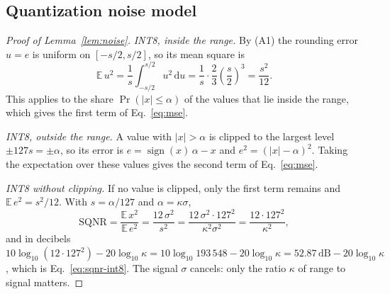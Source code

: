 \documentclass[pdflatex,sn-mathphys-num]{sn-jnl}%
\theoremstyle{thmstyleone}%
\theoremstyle{thmstyletwo}%
\theoremstyle{thmstylethree}%
\begin{document}
\begin{appendices}
\subsection{Quantization noise model}\label{sec:supp-noise}
\begin{proof}[Proof of Lemma~\ref{lem:noise}]
\emph{INT8, inside the range.} By (A1) the rounding error $u=e$ is uniform on $[-s/2,s/2]$, so its mean square is
\begin{equation*}
\mathbb{E}\,u^2=\frac{1}{s}\int_{-s/2}^{s/2}u^2\,\mathrm{d}u=\frac{1}{s}\cdot\frac{2}{3}\left(\frac{s}{2}\right)^3=\frac{s^2}{12}.
\end{equation*}
This applies to the share $\Pr(|x|\le\alpha)$ of the values that lie inside the range, which gives the first term of Eq.~\eqref{eq:mse}.

\emph{INT8, outside the range.} A value with $|x|>\alpha$ is clipped to the largest level $\pm127s=\pm\alpha$, so its error is $e=\operatorname{sign}(x)\,\alpha-x$ and $e^2=(|x|-\alpha)^2$. Taking the expectation over these values gives the second term of Eq.~\eqref{eq:mse}.

\emph{INT8 without clipping.} If no value is clipped, only the first term remains and $\mathbb{E}\,e^2=s^2/12$. With $s=\alpha/127$ and $\alpha=\kappa\sigma$,
\begin{equation*}
\mathrm{SQNR}=\frac{\mathbb{E}\,x^2}{\mathbb{E}\,e^2}=\frac{12\,\sigma^2}{s^2}=\frac{12\,\sigma^2\cdot127^2}{\kappa^2\sigma^2}=\frac{12\cdot127^2}{\kappa^2},
\end{equation*}
and in decibels $10\log_{10}(12\cdot127^2)-20\log_{10}\kappa=10\log_{10}193\,548-20\log_{10}\kappa=52.87\,\mathrm{dB}-20\log_{10}\kappa$, which is Eq.~\eqref{eq:sqnr-int8}. The signal $\sigma$ cancels: only the ratio $\kappa$ of range to signal matters.


\end{proof}
\end{appendices}
\end{document}
